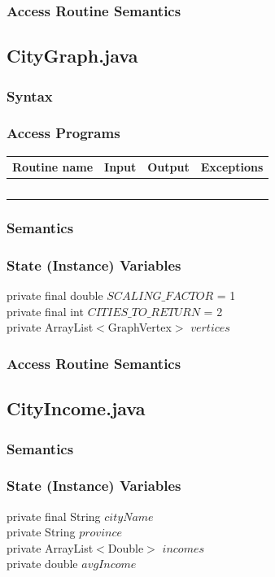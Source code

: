 \documentclass[12pt,fleqn]{article}
\begin{document}
\subsubsection*{Access Routine Semantics}


\subsection*{CityGraph.java}\label{pgraph}
\subsubsection* {Syntax}

\subsubsection* {Access Programs}
\begin{tabular}{| l | l | l | l |}
\hline
\textbf{Routine name} & \textbf{Input} & \textbf{Output} & \textbf{Exceptions}\\
\hline
~ & ~ & ~ & ~\\
\hline
\end{tabular}

\subsubsection*{Semantics}
\subsubsection*{State (Instance) Variables}
	private final double $SCALING\_FACTOR$ = 1\\
	private final int $CITIES\_TO\_RETURN$ = 2\\
	private ArrayList$<$GraphVertex$>$ $vertices$
\subsubsection*{Access Routine Semantics}


\subsection*{CityIncome.java}\label{pcityincome}

\subsubsection*{Semantics}
\subsubsection*{State (Instance) Variables}
	private final String $cityName$\\
	private String $province$\\
	private ArrayList$<$Double$>$ $incomes$\\
	private double $avgIncome$
\end{document}
